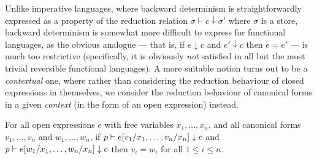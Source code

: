 Unlike imperative languages, where backward determinism is straightforwardly
expressed as a property of the reduction relation $\sigma \vdash c \downarrow
\sigma'$ where $\sigma$ is a store, backward determinism is somewhat more
difficult to express for functional languages, as the obvious analogue --- that
is, if $e \downarrow c$ and $e' \downarrow c$ then $e = e'$ --- is much too
restrictive (specifically, it is obviously \emph{not} satisfied in all but the
most trivial reversible functional languages). A more suitable notion turns out
to be a \emph{contextual} one, where rather than considering the reduction
behaviour of closed expressions in themselves, we consider the reduction
behaviour of canonical forms in a given \emph{context} (in the form of an open
expression) instead.

{
\renewcommand{\thetheorem}{\ref{thm:ctxbackwarddet}}
\begin{theorem}

  For all open expressions $e$ with free variables $x_1, \dots, x_n$, and all
  canonical forms $v_1, \dots, v_n$ and $w_1, \dots, w_n$, if $p \vdash e[v_1 /
  x_1, \dots, v_n / x_n] \downarrow c$ and $p \vdash e[w_1 / x_1, \dots, w_n /
  x_n] \downarrow c$ then $v_i = w_i$  for all $1 \le i \le n$.

\end{theorem}
\addtocounter{theorem}{-1}
}

